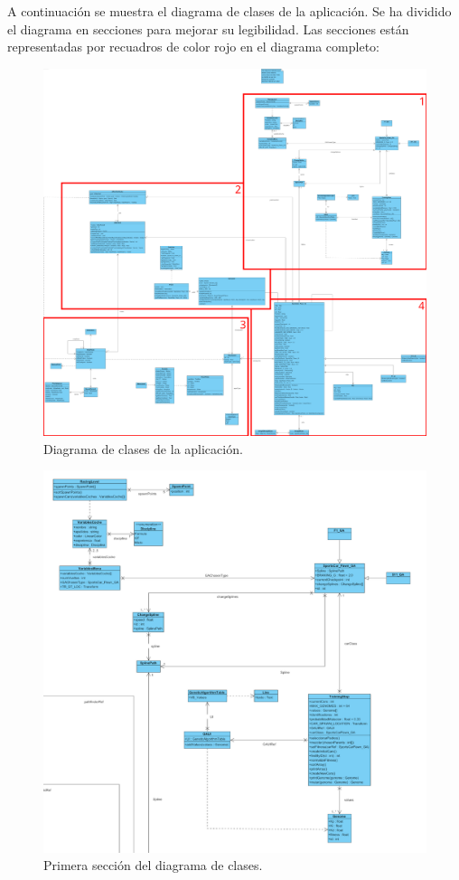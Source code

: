 A continuación se muestra el diagrama de clases de la aplicación. Se ha dividido el diagrama en secciones para mejorar su legibilidad. Las secciones están representadas por recuadros de color rojo en el diagrama completo:

\begin{figure}[H]
    \centering
    \includegraphics[width=\textwidth]{imagenes/classDiagramSections.png}
    \caption{Diagrama de clases de la aplicación.}
\end{figure}

\begin{figure}[H]
    \centering
    \includegraphics[width=\textwidth]{imagenes/classDiagram1.png}
    \caption{Primera sección del diagrama de clases.}
\end{figure}

